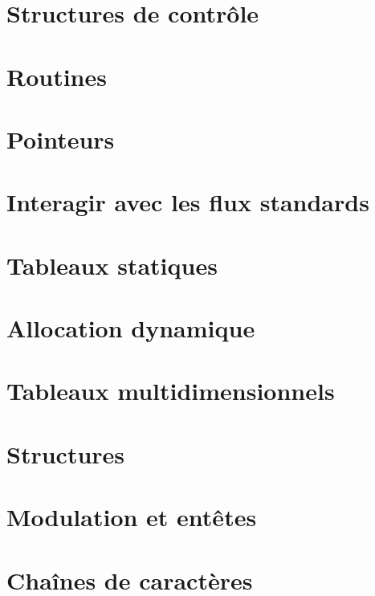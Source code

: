 \documentclass{minitelreport}
\begin{document}
\begin{refsection}
		\section{Structures de contrôle}
			\label{sec:structures_controle}
			
		\section{Routines}
			\label{sec:routines}
			
		\section{Pointeurs}
			\label{sec:pointeurs}
			
		\section{Interagir avec les flux standards}
			\label{sec:flux_standards}
			
		\section{Tableaux statiques}
			\label{sec:tableaux_statiques}
			
		\section{Allocation dynamique}
			\label{sec:allocation_dynamique}
			
		\section{Tableaux multidimensionnels}
			\label{sec:tableaux_multidimensionnels}
			
		\section{Structures}
			\label{sec:structures}
			
		\section{Modulation et entêtes}
			\label{sec:modulation_et_entetes}
			
		\section{Chaînes de caractères}
			\label{sec:chaines_caracteres}
			

\end{refsection}
\end{document}
